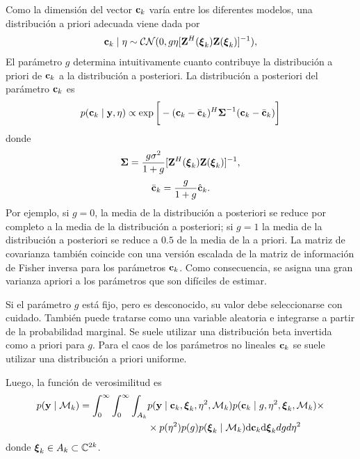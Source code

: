 Como la dimensión del vector $\mathbf{c}_k$ varía entre los diferentes modelos, una distribución a priori adecuada viene dada por \cite{Zellner88}
\begin{equation}
	\mathbf{c}_k\mid \eta \sim \mathcal{CN}(0,g\eta[\mathbf{Z}^H(\boldsymbol{\xi}_k)\mathbf{Z}(\boldsymbol{\xi}_k)]^{-1}),
	\label{eq:BIC10}
\end{equation}
El parámetro $g$ determina intuitivamente cuanto contribuye la distribución a priori de $\mathbf{c}_k$ a la distribución a posteriori. La distribución a posteriori del parámetro $\mathbf{c}_k$ es
\begin{equation}
	p(\mathbf{c}_k\mid \mathbf{y}, \eta) \propto \exp\bigg[-(\mathbf{c}_k-\bar{\mathbf{c}}_k)^H\boldsymbol{\Sigma}^{-1}(\mathbf{c}_k-\bar{\mathbf{c}}_k)\bigg]
\end{equation}
donde
\begin{equation}
	\boldsymbol{\Sigma} = \frac{g\sigma^2}{1+g}[\mathbf{Z}^H(\boldsymbol{\xi}_k)\mathbf{Z}(\boldsymbol{\xi}_k)]^{-1},
\end{equation}
\begin{equation}
	\bar{\mathbf{c}}_k = \frac{g}{1+g}\hat{\mathbf{c}}_k.
\end{equation}
Por ejemplo, si $g=0$, la media de la distribución a posteriori se reduce por completo a la media de la distribución a posteriori; si $g=1$ la media de la distribución a posteriori se reduce a $0.5$ de la media de la a priori. La matriz de covarianza también coincide con una versión escalada de la matriz de información de Fisher inversa para los parámetros $\mathbf{c}_k$. Como consecuencia, se asigna una gran varianza apriori a los parámetros que son difíciles de estimar. 

Si el parámetro $g$ está fijo, pero es desconocido, su valor debe seleccionarse con cuidado. También puede tratarse como una variable aleatoria e integrarse a partir de la probabilidad marginal. Se suele utilizar una distribución beta invertida como a priori para $g$. Para el caos de los parámetros no lineales $\mathbf{c}_k$ se suele utilizar una distribución a priori uniforme.

Luego, la función de verosimilitud es
\begin{equation}
	\begin{aligned}
		p(\mathbf{y}\mid\mathcal{M}_k) = \int_{0}^\infty \int_{0}^\infty \int_{A_k} & p(\mathbf{y}\mid\mathbf{c}_k,\boldsymbol{\xi}_k,\eta^2,\mathcal{M}_k)p(\mathbf{c}_k\mid g,\eta^2,\boldsymbol{\xi}_k,\mathcal{M}_k) \times \\& \times p(\eta^2)p(g)p(\boldsymbol{\xi}_k\mid\mathcal{M}_k)\mathrm{d}\mathbf{c}_k\mathrm{d}\boldsymbol{\xi}_kdgd\eta^2
	\end{aligned} \label{eq:BIC11}
\end{equation}
donde $\boldsymbol{\xi}_k\in A_k\subset\mathbb{C}^{2k}$.

